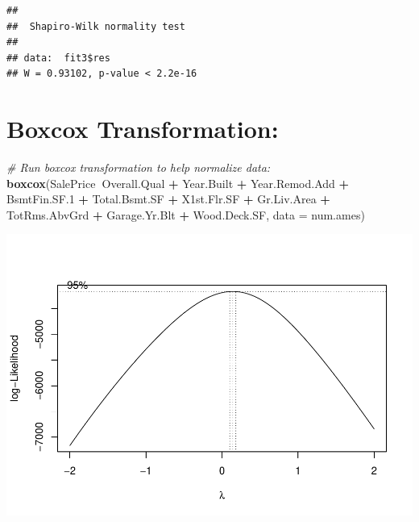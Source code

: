 \documentclass[
]{article}
\newenvironment{Shaded}{\begin{snugshade}}{\end{snugshade}}
\newcommand{\CommentTok}[1]{\textcolor[rgb]{0.56,0.35,0.01}{\textit{#1}}}
\newcommand{\DataTypeTok}[1]{\textcolor[rgb]{0.13,0.29,0.53}{#1}}
\newcommand{\FloatTok}[1]{\textcolor[rgb]{0.00,0.00,0.81}{#1}}
\newcommand{\KeywordTok}[1]{\textcolor[rgb]{0.13,0.29,0.53}{\textbf{#1}}}
\newcommand{\NormalTok}[1]{#1}
\newcommand{\OperatorTok}[1]{\textcolor[rgb]{0.81,0.36,0.00}{\textbf{#1}}}
\newcommand{\StringTok}[1]{\textcolor[rgb]{0.31,0.60,0.02}{#1}}
\begin{document}
\begin{Shaded}
\end{Shaded}

\begin{verbatim}
## 
##  Shapiro-Wilk normality test
## 
## data:  fit3$res
## W = 0.93102, p-value < 2.2e-16
\end{verbatim}

\hypertarget{boxcox-transformation}{%
\section{Boxcox Transformation:}\label{boxcox-transformation}}

\begin{Shaded}
\begin{Highlighting}[]
\CommentTok{# Run boxcox transformation to help normalize data:}
\KeywordTok{boxcox}\NormalTok{(SalePrice}\OperatorTok{~}\NormalTok{Overall.Qual }\OperatorTok{+}\StringTok{ }\NormalTok{Year.Built }\OperatorTok{+}\StringTok{ }\NormalTok{Year.Remod.Add }\OperatorTok{+}\StringTok{ }\NormalTok{BsmtFin.SF}\FloatTok{.1} \OperatorTok{+}\StringTok{ }\NormalTok{Total.Bsmt.SF }\OperatorTok{+}\StringTok{ }\NormalTok{X1st.Flr.SF }\OperatorTok{+}\StringTok{ }\NormalTok{Gr.Liv.Area }\OperatorTok{+}\StringTok{ }\NormalTok{TotRms.AbvGrd }\OperatorTok{+}
\StringTok{         }\NormalTok{Garage.Yr.Blt }\OperatorTok{+}\StringTok{ }\NormalTok{Wood.Deck.SF, }\DataTypeTok{data =}\NormalTok{ num.ames)}
\end{Highlighting}
\end{Shaded}

\includegraphics{Predicting-Housing-Price_files/figure-latex/unnamed-chunk-5-1.pdf}
\end{document}
